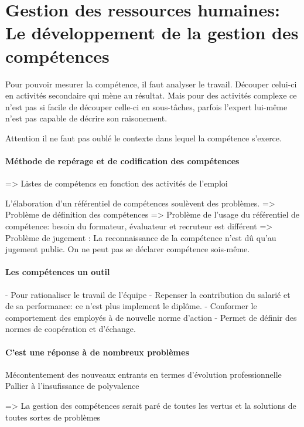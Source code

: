 \section{Gestion des ressources humaines: Le développement de la gestion des compétences}


Pour pouvoir mesurer la compétence, il faut analyser le travail. Découper celui-ci en activités secondaire qui mène au résultat.
Mais pour des activités complexe ce n'est pas si facile de découper celle-ci en sous-tâches, parfois l'expert lui-même n'est pas capable de décrire son raisonement.

Attention il ne faut pas oublé le contexte dans lequel la compétence s'exerce. 

\paragraph{Méthode de repérage et de codification des compétences}



=> Listes de compétencs en fonction des activités de l'emploi

L'élaboration d'un référentiel de compétences soulèvent des problèmes. 
=> Problème de définition des compétences 
=> Problème de l'usage du référentiel de compétence: besoin du formateur, évaluateur et recruteur est différent
=> Problème de jugement : La reconnaissance de la compétence n'est dû qu'au jugement public. On ne peut pas se déclarer compétence sois-même. 



\paragraph{Les compétences un outil}
- Pour rationaliser le travail de l'équipe
- Repenser la contribution du salarié et de sa performance: ce n'est plus implement le diplôme. 
- Conformer le comportement des employés à de nouvelle norme d'action 
- Permet de définir des normes de coopération et d'échange. 

\paragraph{C'est une réponse à de nombreux problèmes}
Mécontentement des nouveaux entrants en termes d'évolution professionnelle
Pallier à l'insufissance de polyvalence

=> La gestion des compétences serait paré de toutes les vertus et la solutions de toutes sortes de problèmes

